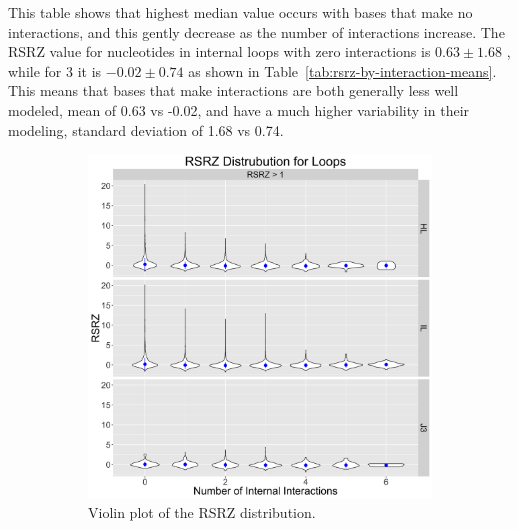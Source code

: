 This table shows that highest median value occurs with bases that make no
interactions, and this gently decrease as the number of interactions increase.
The RSRZ value for nucleotides in internal loops with zero interactions is $0.63
\pm 1.68$ , while for 3 it is $-0.02 \pm 0.74$ as shown in
Table~\ref{tab:rsrz-by-interaction-means}. This means that bases that make
interactions are both generally less well modeled, mean of 0.63 vs -0.02, and
have a much higher variability in their modeling, standard deviation of 1.68 vs
0.74.

\begin{figure}
  \begin{subfigure}[b]{0.45\textwidth}
    \includegraphics[width=\textwidth]{chapter-5/figs/loops/a}
    \caption{Violin plot of the RSRZ distribution.}
    \label{fig:rsrz-dist}
  \end{subfigure}
  ~
  \begin{subfigure}[b]{0.45\textwidth}

\end{subfigure}
\end{figure}
